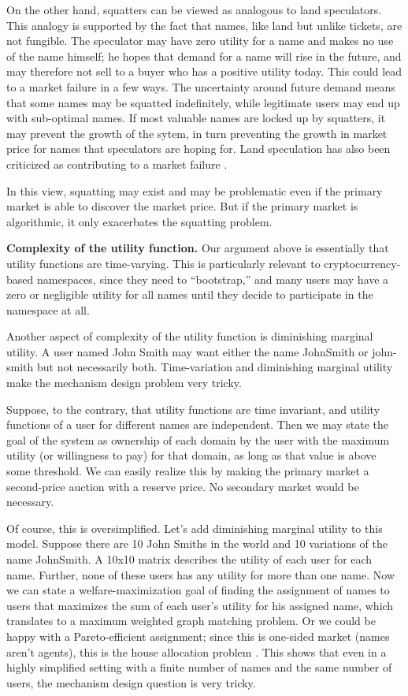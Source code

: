 On the other hand, squatters can be viewed as analogous to land speculators. This analogy is supported by the fact that names, like land but unlike tickets, are not fungible. The speculator may have zero utility for a name and makes no use of the name himself; he hopes that demand for a name will rise in the future, and may therefore not sell to a buyer who has a positive utility today. This could lead to a market failure in a few ways. The uncertainty around future demand means that some names may be squatted indefinitely, while legitimate users may end up with sub-optimal names. If most valuable names are locked up by squatters, it may prevent the growth of the sytem, in turn preventing the growth in market price for names that speculators are hoping for. Land speculation has also been criticized as contributing to a market failure \cite{ottensmann1977urban}. 


In this view, squatting may exist and may be problematic even if the primary market is able to discover the market price. But if the primary market is algorithmic, it only exacerbates the squatting problem.


{\bf Complexity of the utility function.} 
Our argument above is essentially that utility functions are time-varying. This is particularly relevant to cryptocurrency-based namespaces, since they need to ``bootstrap,'' \hi{[explain]} and many users may have a zero or negligible utility for all names until they decide to participate in the namespace at all.

Another aspect of complexity of the utility function is diminishing marginal utility. A user named John Smith may want either the name \textsf{JohnSmith} or \textsf{john-smith} but not necessarily both. Time-variation and diminishing marginal utility make the mechanism design problem very tricky.

Suppose, to the contrary, that utility functions are time invariant, and utility functions of a user for different names are independent. Then we may state the goal of the system as ownership of each domain by the user with the maximum utility (or willingness to pay) for that domain, as long as that value is above some threshold. We can easily realize this by making the primary market a second-price auction with a reserve price. No secondary market would be necessary.

Of course, this is oversimplified. Let's add diminishing marginal utility to this model. Suppose there are 10 John Smiths in the world and 10 variations of the name \textsf{JohnSmith}. A 10x10 matrix describes the utility of each user for each name. Further, none of these users has any utility for more than one name. Now we can state a welfare-maximization goal of finding the assignment of names to users that maximizes the sum of each user's utility for his assigned name, which translates to a maximum weighted graph matching problem. Or we could be happy with a Pareto-efficient assignment; since this is one-sided market (names aren't agents), this is the house allocation problem \cite{abdulkadiroglu2013matching}. This shows that even in a highly simplified setting with a finite number of names and the same number of users, the mechanism design question is very tricky.

